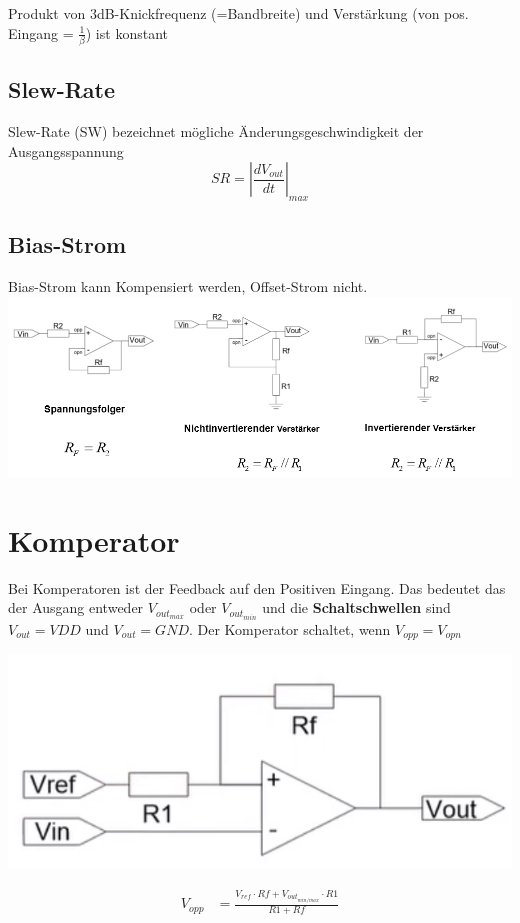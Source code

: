Produkt von 3dB-Knickfrequenz (=Bandbreite) und Verstärkung (von pos. Eingang = $\frac{1}{\beta}$) ist konstant

\subsection{Slew-Rate}
Slew-Rate (SW) bezeichnet mögliche Änderungsgeschwindigkeit der Ausgangsspannung
\[
SR = \left|\frac{dV_{out}}{dt}\right|_{max}
\]

\subsection{Bias-Strom}
Bias-Strom kann Kompensiert werden, Offset-Strom nicht.\\
\includegraphics[width=\columnwidth]{Images/bias-kompensation}


\section{Komperator}
Bei Komperatoren ist der Feedback auf den Positiven Eingang. Das bedeutet das der Ausgang entweder $V_{out_{max}}$ oder $V_{out_{min}}$ und die \textbf{Schaltschwellen} sind $V_{out} = VDD$ und $V_{out} = GND$. Der Komperator schaltet, wenn $V_{opp} = V_{opn}$\\
\begin{minipage}{0.20\textwidth}
	\includegraphics[width=\linewidth,keepaspectratio=true]{./Images/komperator_invertierend}
\end{minipage}%
\begin{minipage}{0.30\textwidth}
	\begin{align*}
		V_{opp} &= \frac{V_{ref}\cdot Rf + V_{out_{min/max}}\cdot R1}{R1 + Rf}
	\end{align*}
\end{minipage}

